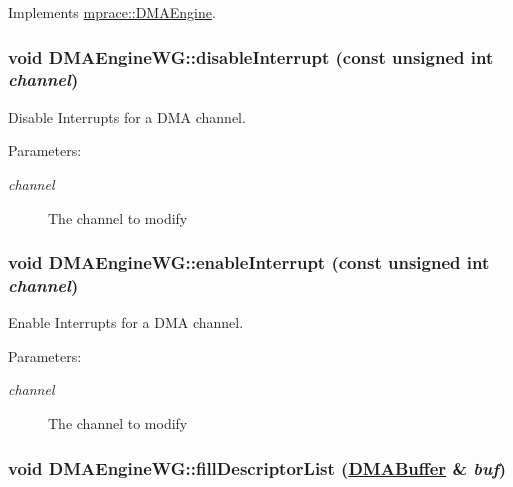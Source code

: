 Implements \hyperlink{classmprace_1_1DMAEngine_a4}{mprace::DMAEngine}.\hypertarget{classmprace_1_1DMAEngineWG_b3}{
\subsubsection[disableInterrupt]{\setlength{\rightskip}{0pt plus 5cm}void DMAEngine\-WG::disable\-Interrupt (const unsigned int {\em channel})}}
\label{classmprace_1_1DMAEngineWG_b3}


Disable Interrupts for a DMA channel. 

\begin{Desc}
\item[Parameters:]
\begin{description}
\item[{\em channel}]The channel to modify\end{description}
\end{Desc}
\hypertarget{classmprace_1_1DMAEngineWG_b2}{
\subsubsection[enableInterrupt]{\setlength{\rightskip}{0pt plus 5cm}void DMAEngine\-WG::enable\-Interrupt (const unsigned int {\em channel})}}
\label{classmprace_1_1DMAEngineWG_b2}


Enable Interrupts for a DMA channel. 

\begin{Desc}
\item[Parameters:]
\begin{description}
\item[{\em channel}]The channel to modify\end{description}
\end{Desc}
\hypertarget{classmprace_1_1DMAEngineWG_a6}{
\subsubsection[fillDescriptorList]{\setlength{\rightskip}{0pt plus 5cm}void DMAEngine\-WG::fill\-Descriptor\-List (\hyperlink{classmprace_1_1DMABuffer}{DMABuffer} \& {\em buf})}}
\label{classmprace_1_1DMAEngineWG_a6}


